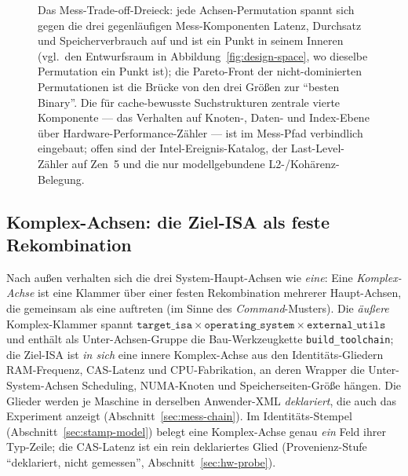\begin{nurkurz}
\begin{figure}[htbp]
\caption{Das Mess-Trade-off-Dreieck: jede Achsen-Permutation spannt sich gegen die drei gegenläufigen
Mess-Komponenten Latenz, Durchsatz und Speicherverbrauch auf und ist ein Punkt in seinem Inneren (vgl.\ den
Entwurfsraum in Abbildung~\ref{fig:design-space}, wo dieselbe Permutation ein Punkt ist); die Pareto-Front
der nicht-dominierten Permutationen ist die Brücke von den drei Größen zur \enquote{besten Binary}. Die für
cache-bewusste Suchstrukturen zentrale vierte Komponente --- das Verhalten auf Knoten-, Daten- und
Index-Ebene über Hardware-Performance-Zähler --- ist im Mess-Pfad verbindlich eingebaut; offen sind der
Intel-Ereignis-Katalog, der Last-Level-Zähler auf Zen~5 und die nur modellgebundene L2-/Kohärenz-Belegung.}\label{fig:measurement-triangle}
\end{figure}
\subsection{Komplex-Achsen: die Ziel-ISA als feste Rekombination}\label{sec:complex-axis}
Nach außen verhalten sich die drei System-Haupt-Achsen wie \emph{eine}: Eine \emph{Komplex-Achse} ist eine
Klammer über einer festen Rekombination mehrerer Haupt-Achsen, die gemeinsam als eine auftreten (im Sinne des
\emph{Command}-Musters). Die \emph{äußere} Komplex-Klammer spannt
$\texttt{target\_isa} \times \texttt{operating\_system} \times \texttt{external\_utils}$ und enthält als
Unter-Achsen-Gruppe die Bau-Werkzeugkette \texttt{build\_toolchain}; die Ziel-ISA ist \emph{in sich} eine
innere Komplex-Achse aus den Identitäts-Gliedern RAM-Frequenz, CAS-Latenz und CPU-Fabrikation, an deren Wrapper
die Unter-System-Achsen Scheduling, NUMA-Knoten und Speicherseiten-Größe hängen. Die Glieder werden je Maschine
in derselben Anwender-XML \emph{deklariert}, die auch das Experiment anzeigt (Abschnitt~\ref{sec:mess-chain}).
Im Identitäts-Stempel (Abschnitt~\ref{sec:stamp-model}) belegt eine Komplex-Achse genau \emph{ein} Feld ihrer
Typ-Zeile; die CAS-Latenz ist ein rein deklariertes Glied (Provenienz-Stufe \enquote{deklariert, nicht
gemessen}, Abschnitt~\ref{sec:hw-probe}).

\end{nurkurz}

